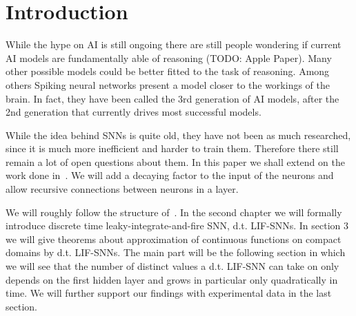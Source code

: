 \section{Introduction}
\label{ch:intro}

While the hype on AI is still ongoing there are still people wondering if current AI models are fundamentally able of reasoning (TODO: Apple Paper). Many other possible models could be better fitted to the task of reasoning. Among others Spiking neural networks present a model closer to the workings of the brain. In fact, they have been called the 3rd generation of AI models, after the 2nd generation that currently drives most successful models.

While the idea behind SNNs is quite old, they have not been as much researched, since it is much more inefficient and harder to train them. Therefore there still remain a lot of open questions about them.
In this paper we shall extend on the work done in~\cite{nguyen2025timespikeunderstandingrepresentational}. We will add a decaying factor to the input of the neurons and allow recursive connections between neurons in a layer.

We will roughly follow the structure of~\cite{nguyen2025timespikeunderstandingrepresentational}. In the second chapter we will formally introduce discrete time leaky-integrate-and-fire SNN, d.t. LIF-SNNs. In section 3 we will give theorems about approximation of continuous functions on compact domains by d.t. LIF-SNNs.
The main part will be the following section in which we will see that the number of distinct values a d.t. LIF-SNN can take on only depends on the first hidden layer and grows in particular only quadratically in time. We will further support our findings with experimental data in the last section.
